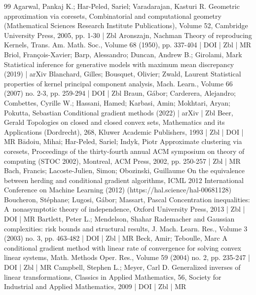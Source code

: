 \documentclass[10pt]{amsart}
\theoremstyle{definition}\newtheorem{defi}[theo]{Definition}\newtheorem{rema}[theo]{Remark}\newtheorem{exam}[theo]{Example}\newtheorem{exem}[theo]{Example}\newtheorem{nota}[theo]{Notation}
\theoremstyle{remark}
\begin{document}
\newpage



\begin{thebibliography}{99}
Agarwal, Pankaj K.; Har-Peled, Sariel; Varadarajan, Kasturi R. Geometric approximation via coresets, Combinatorial and computational geometry (Mathematical Sciences Research Institute Publications), Volume 52, Cambridge University Press, 2005, pp. 1-30 | Zbl
Aronszajn, Nachman Theory of reproducing Kernels, Trans. Am. Math. Soc., Volume 68 (1950), pp. 337-404 | DOI | Zbl | MR
Briol, François-Xavier; Barp, Alessandro; Duncan, Andrew B.; Girolami, Mark Statistical inference for generative models with maximum mean discrepancy (2019) | arXiv
Blanchard, Gilles; Bousquet, Olivier; Zwald, Laurent Statistical properties of kernel principal component analysis, Mach. Learn., Volume 66 (2007) no. 2-3, pp. 259-294 | DOI | Zbl
Braun, Gábor; Carderera, Alejandro; Combettes, Cyrille W.; Hassani, Hamed; Karbasi, Amin; Mokhtari, Aryan; Pokutta, Sebastian Conditional gradient methods (2022) | arXiv | Zbl
Beer, Gerald Topologies on closed and closed convex sets, Mathematics and its Applications (Dordrecht), 268, Kluwer Academic Publishers, 1993 | Zbl | DOI | MR
Bādoiu, Mihai; Har-Peled, Sariel; Indyk, Piotr Approximate clustering via coresets, Proceedings of the thirty-fourth annual ACM symposium on theory of computing (STOC 2002), Montreal, ACM Press, 2002, pp. 250-257 | Zbl | MR
Bach, Francis; Lacoste-Julien, Simon; Obozinski, Guillaume On the equivalence between herding and conditional gradient algorithms, ICML 2012 International Conference on Machine Learning (2012) (https://hal.science/hal-00681128)
Boucheron, Stéphane; Lugosi, Gábor; Massart, Pascal Concentration inequalities: A nonasymptotic theory of independence, Oxford University Press, 2013 | Zbl | DOI | MR
Bartlett, Peter L.; Mendelson, Shahar Rademacher and Gaussian complexities: risk bounds and structural results, J. Mach. Learn. Res., Volume 3 (2003) no. 3, pp. 463-482 | DOI | Zbl | MR
Beck, Amir; Teboulle, Marc A conditional gradient method with linear rate of convergence for solving convex linear systems, Math. Methods Oper. Res., Volume 59 (2004) no. 2, pp. 235-247 | DOI | Zbl | MR
Campbell, Stephen L.; Meyer, Carl D. Generalized inverses of linear transformations, Classics in Applied Mathematics, 56, Society for Industrial and Applied Mathematics, 2009 | DOI | Zbl | MR

\end{thebibliography}
\end{document}
